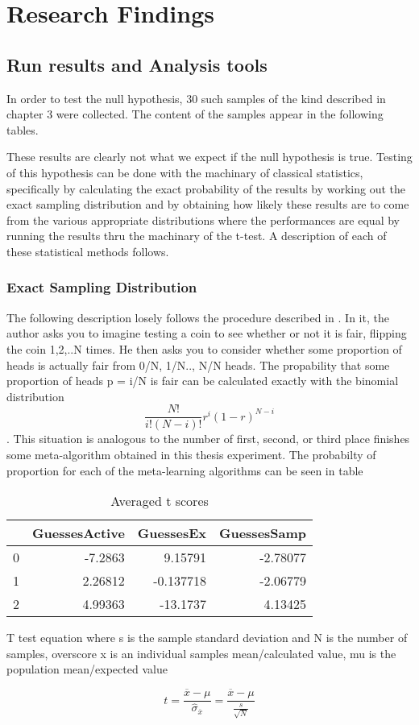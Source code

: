 \chapter{Research Findings}
\label{Chapter4}
\section{Run results and Analysis tools}
In order to test the null hypothesis, 30 such samples of the kind described
in chapter 3 were collected. The content of the samples appear in the following
tables.




These results are clearly not what we expect if the null hypothesis is true.
Testing of this hypothesis can be done with the machinary of classical
statistics, specifically by calculating the exact probability of the results
by working out the exact sampling distribution and by obtaining how likely these
results are to come from the various appropriate distributions where
the performances are equal by running the results thru the machinary of the
t-test. A description of each of these statistical methods follows.

\subsection{Exact Sampling Distribution}
The following description losely follows the procedure described in \cite{Cohen}.
In it, the author asks you to imagine testing a coin to see whether or not it
is fair, flipping the coin 1,2,..N times. He then asks you to consider whether
some proportion of heads is actually fair from 0/N, 1/N.., N/N heads. The
propability that some proportion of heads p = i/N is fair can be calculated
exactly with the binomial distribution $$\frac{N!}{i!(N-i)!}r^{i}(1-r)^{N-i}$$.
This situation is analogous to the number of first, second, or third place
finishes some meta-algorithm obtained in this thesis experiment. The probabilty
of proportion for each of the meta-learning algorithms can be seen in table

\begin{table}
\begin{tabular}{|r|r|r|r|}
\hline
    &   GuessesActive &   GuessesEx &   GuessesSamp \\
\hline
  0 &        -7.2863  &    9.15791  &      -2.78077 \\
\hline
  1 &         2.26812 &   -0.137718 &      -2.06779 \\
\hline
  2 &         4.99363 &  -13.1737   &       4.13425 \\
\hline
\end{tabular}
\caption{Averaged t scores}
\end{table}

T test equation where s is the sample standard deviation and N is the number of
samples, overscore x is an individual samples mean/calculated value, mu is the
population mean/expected value

$$t =\frac{\overline{x}-\mu}{\hat{\sigma}_{\overline{x}}} = \frac{\overline{x}-\mu}{\frac{s}{\sqrt{N}}}$$
